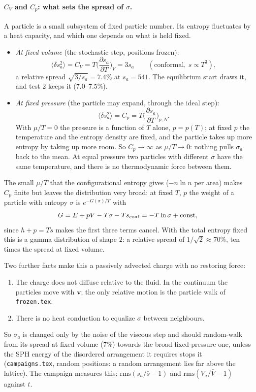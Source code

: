 \documentclass[11pt,aps,preprint,nofootinbib,superscriptaddress,tightenlines]{revtex4-2}
\def\st{\begin{equation}}
\def\stp{\end{equation}}
\newcommand{\avg}[1]{\langle #1\rangle}
\let\oldparagraph\paragraph
\renewcommand{\paragraph}{\par\bigskip\oldparagraph}
\begin{document}
\paragraph{$C_V$ and $C_p$: what sets the spread of $\sigma$.}  A particle is a small
subsystem of fixed particle number.  Its entropy fluctuates by a heat capacity, and
which one depends on what is held fixed.
\begin{itemize}
\item \emph{At fixed volume} (the stochastic step, positions frozen):
\st
\avg{\delta s_a^2}=C_V=T\Big(\frac{\partial s_a}{\partial T}\Big)_V=3s_a
\qquad(\text{conformal},\ s\propto T^3),
\stp
a relative spread $\sqrt{3/s_a}=7.4\%$ at $s_a=541$.  The equilibrium start draws it,
and test 2 keeps it ($7.0$--$7.5\%$).
\item \emph{At fixed pressure} (the particle may expand, through the ideal step):
\st
\avg{\delta s_a^2}=C_p=T\Big(\frac{\partial s_a}{\partial T}\Big)_{p,N}.
\stp
With $\mu/T=0$ the pressure is a function of $T$ alone, $p=p(T)$; at fixed $p$ the
temperature and the entropy density are fixed, and the particle takes up more entropy by
taking up more room.  So $C_p\to\infty$ as $\mu/T\to0$: nothing pulls $\sigma_a$ back to
the mean.  At equal pressure two particles with different $\sigma$ have the same
temperature, and there is no thermodynamic force between them.
\end{itemize}
The small $\mu/T$ that the configurational entropy gives ($-n\ln n$ per area) makes $C_p$
finite but leaves the distribution very broad: at fixed $T$, $p$ the weight of a
particle with entropy $\sigma$ is $e^{-G(\sigma)/T}$ with
\st
G=E+pV-T\sigma-T s_{\rm conf}=-T\ln\sigma+\text{const},
\stp
since $h+p=Ts$ makes the first three terms cancel.  With the total entropy fixed this is
a gamma distribution of shape $2$: a relative spread of $1/\sqrt2\approx70\%$, ten times the
spread at fixed volume.

Two further facts make this a passively advected charge with no restoring force:
\begin{enumerate}
\item The charge does not diffuse relative to the fluid.  In the continuum the particles
  move with $\bm v$; the only relative motion is the particle walk of \texttt{frozen.tex}.
\item There is no heat conduction to equalize $\sigma$ between neighbours.
\end{enumerate}
So $\sigma_a$ is changed only by the noise of the viscous step and should random-walk from
its spread at fixed volume ($7\%$) towards the broad fixed-pressure one, unless the SPH
energy of the disordered arrangement it requires stops it (\texttt{campaigns.tex}, random
positions: a random arrangement lies far above the lattice).  The campaign measures this:
$\mathrm{rms}(s_a/\bar s-1)$ and $\mathrm{rms}(V_a/\bar V-1)$ against $t$.
\end{document}
